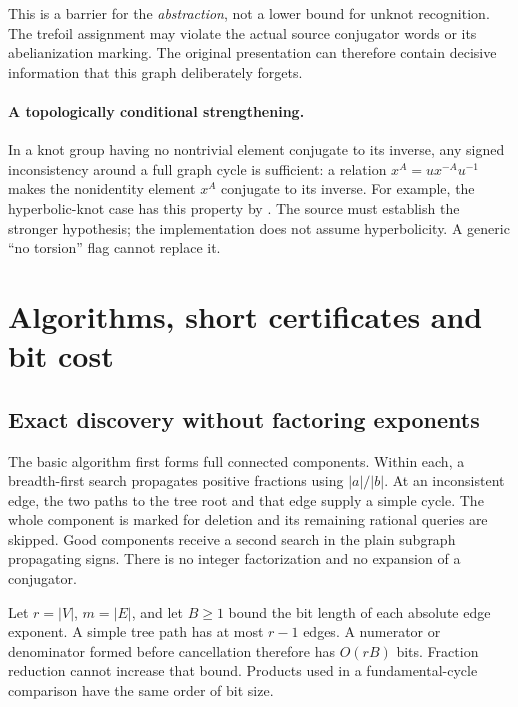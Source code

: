 \documentclass[11pt]{article}
\theoremstyle{definition}\newtheorem{definition}[theorem]{Definition}
\theoremstyle{remark}\newtheorem{remark}[theorem]{Remark}
\begin{document}
This is a barrier for the \emph{abstraction}, not a lower bound for unknot
recognition. The trefoil assignment may violate the actual source
conjugator words or its abelianization marking. The original presentation
can therefore contain decisive information that this graph deliberately
forgets.

\paragraph{A topologically conditional strengthening.}
In a knot group having no nontrivial element conjugate to its inverse,
any signed inconsistency around a full graph cycle is sufficient: a
relation $x^A=u x^{-A}u^{-1}$ makes the nonidentity element $x^A$ conjugate
to its inverse. For example, the hyperbolic-knot case has this property
by \cite[Corollary 1.8]{HMT}. The source must establish the stronger
hypothesis; the implementation does not assume hyperbolicity. A generic
``no torsion'' flag cannot replace it.

\section{Algorithms, short certificates and bit cost}
\label{sec:algorithms}
\subsection{Exact discovery without factoring exponents}
The basic algorithm first forms full connected components. Within each,
a breadth-first search propagates positive fractions using $|a|/|b|$.
At an inconsistent edge, the two paths to the tree root and that edge
supply a simple cycle. The whole component is marked for deletion and
its remaining rational queries are skipped. Good components receive a
second search in the plain subgraph propagating signs. There is no integer
factorization and no expansion of a conjugator.

Let $r=|V|$, $m=|E|$, and let $B\ge1$ bound the bit length of each absolute
edge exponent. A simple tree path has at most $r-1$ edges. A numerator or
denominator formed before cancellation therefore has $O(rB)$ bits.
Fraction reduction cannot increase that bound. Products used in a
fundamental-cycle comparison have the same order of bit size.
\end{document}
